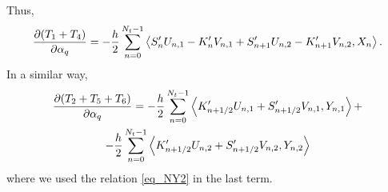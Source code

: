 \documentclass[11pt]{article}
\begin{document}
Thus,
\begin{equation}
  \frac{\partial (T_1 + T_4)}{\partial \alpha_q} = - \frac{h}{2} \sum_{n=0}^{N_t-1} \left\langle S'_nU_{n,1} - K'_nV_{n,1} + S'_{n+1}U_{n,2} -
  K'_{n+1}V_{n,2}, X_{n} \right\rangle.
\end{equation}
In a similar way,
\begin{multline}
  \frac{\partial (T_2 + T_5 + T_6)}{\partial \alpha_q} = - \frac{h}{2} \sum_{n=0}^{N_t-1} \left\langle
  K'_{n+1/2} U_{n,1} + S'_{n+1/2} V_{n,1}, Y_{n,1}\right\rangle + \\ 
  - \frac{h}{2} \sum_{n=0}^{N_t-1} \left\langle K'_{n+1/2} U_{n,2} + S'_{n+1/2} V_{n,2},Y_{n,2} \right\rangle
\end{multline}
where we used the relation \eqref{eq_NY2} in the last term.






\end{document}

